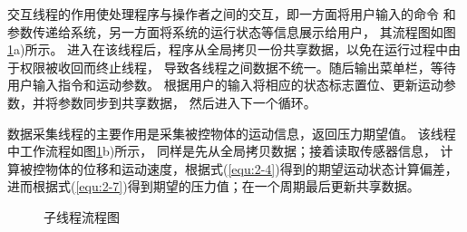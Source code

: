 交互线程的作用使处理程序与操作者之间的交互，即一方面将用户输入的命令
和参数传递给系统，另一方面将系统的运行状态等信息展示给用户，
其流程图如图\ref{fig:3-2}a)所示。
进入在该线程后，程序从全局拷贝一份共享数据，以免在运行过程中由于权限被收回而终止线程，
导致各线程之间数据不统一。随后输出菜单栏，等待用户输入指令和运动参数。
根据用户的输入将相应的状态标志置位、更新运动参数，并将参数同步到共享数据，
然后进入下一个循环。


数据采集线程的主要作用是采集被控物体的运动信息，返回压力期望值。
该线程中工作流程如图\ref{fig:3-2}b)所示， 同样是先从全局拷贝数据；接着读取传感器信息，
计算被控物体的位移和运动速度，根据式(\ref{equ:2-4})得到的期望运动状态计算偏差，
进而根据式(\ref{equ:2-7})得到期望的压力值；在一个周期最后更新共享数据。

\begin{figure}[!ht]
\centering
    \hspace{25pt}
  \caption{子线程流程图}
  \label{fig:3-2}
  \vspace{-0.3cm}
\end{figure}

